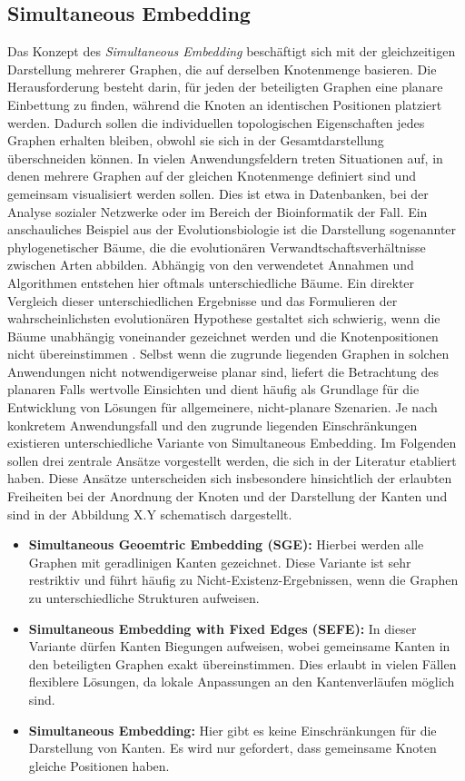 \documentclass[bachelor, german]{algothesis}
\begin{document}
\subsection{Simultaneous Embedding}
Das Konzept des \emph{Simultaneous Embedding} beschäftigt sich mit der gleichzeitigen Darstellung mehrerer Graphen, die auf derselben Knotenmenge basieren. Die Herausforderung besteht darin, für jeden der beteiligten Graphen eine planare Einbettung zu finden, während die Knoten an identischen Positionen platziert werden. Dadurch sollen die individuellen topologischen Eigenschaften jedes Graphen erhalten bleiben, obwohl sie sich in der Gesamtdarstellung überschneiden können.\newline
In vielen Anwendungsfeldern treten Situationen auf, in denen mehrere Graphen auf der gleichen Knotenmenge definiert sind und gemeinsam visualisiert werden sollen. Dies ist etwa in Datenbanken, bei der Analyse sozialer Netzwerke oder im Bereich der Bioinformatik der Fall. \newline
Ein anschauliches Beispiel aus der Evolutionsbiologie ist die Darstellung sogenannter phylogenetischer Bäume, die die evolutionären Verwandtschaftsverhältnisse zwischen Arten abbilden. Abhängig von den verwendetet Annahmen und Algorithmen entstehen hier oftmals unterschiedliche Bäume. Ein direkter Vergleich dieser unterschiedlichen Ergebnisse und das Formulieren der wahrscheinlichsten evolutionären Hypothese gestaltet sich schwierig, wenn die Bäume unabhängig voneinander gezeichnet werden und die Knotenpositionen nicht übereinstimmen \cite{Handbook}. \newline
Selbst wenn die zugrunde liegenden Graphen in solchen Anwendungen nicht notwendigerweise planar sind, liefert die Betrachtung des planaren Falls wertvolle Einsichten und dient häufig als Grundlage für die Entwicklung von Lösungen für allgemeinere, nicht-planare Szenarien.\newline
Je nach konkretem Anwendungsfall und den zugrunde liegenden Einschränkungen existieren unterschiedliche Variante von Simultaneous Embedding. Im Folgenden sollen drei zentrale Ansätze vorgestellt werden, die sich in der Literatur etabliert haben. Diese Ansätze unterscheiden sich insbesondere hinsichtlich der erlaubten Freiheiten bei der Anordnung der Knoten und der Darstellung der Kanten und sind in der Abbildung X.Y schematisch dargestellt.
\begin{itemize}
    \item \textbf{Simultaneous Geoemtric Embedding (SGE):} Hierbei werden alle Graphen mit geradlinigen Kanten gezeichnet. Diese Variante ist sehr restriktiv und führt häufig zu Nicht-Existenz-Ergebnissen, wenn die Graphen zu unterschiedliche Strukturen aufweisen.
    \item  \textbf{Simultaneous Embedding with Fixed Edges (SEFE):} In dieser Variante dürfen Kanten Biegungen aufweisen, wobei gemeinsame Kanten in den beteiligten Graphen exakt übereinstimmen. Dies erlaubt in vielen Fällen flexiblere Lösungen, da lokale Anpassungen an den Kantenverläufen möglich sind.
    \item \textbf{Simultaneous Embedding:} Hier gibt es keine Einschränkungen für die Darstellung von Kanten. Es wird nur gefordert, dass gemeinsame Knoten gleiche Positionen haben.
\end{itemize}
\end{document}
